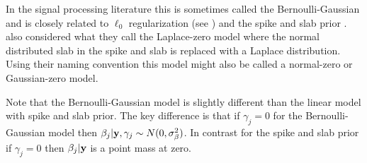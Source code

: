 \documentclass[11pt]{article}
\newtheorem{Main Result}{Main Result}
\def\vectorfontone{\bf}
\def\vy{{\vectorfontone y}}                      %
\newcommand{\joc}[1]{{\color{black}#1}}
\begin{document}
In the signal processing literature this is sometimes called
the Bernoulli-Gaussian \citep{Soussen2011}  and is closely
related to $\ell_0$ regularization (see \citealp[Section 13.2.2]{Murphy2012})
\joc{
and the spike and slab prior \citep{wandormerod2011}.}
\cite{wandormerod2011} also considered what they call the Laplace-zero model where the
normal distributed slab in the spike and slab is replaced with a Laplace
distribution. Using their naming convention this model might also be called a
normal-zero or Gaussian-zero model. 

\joc{
Note that the Bernoulli-Gaussian model 
is slightly different than the linear model with spike and slab prior. The
key difference is that if $\gamma_j = 0$
for the Bernoulli-Gaussian model then 
$\beta_j|\vy,\gamma_j \sim N(0,\sigma_\beta^2)$. In contrast for the spike
and slab prior if $\gamma_j = 0$ then $\beta_j|\vy$ is a point mass
at zero.}

 

\end{document}
